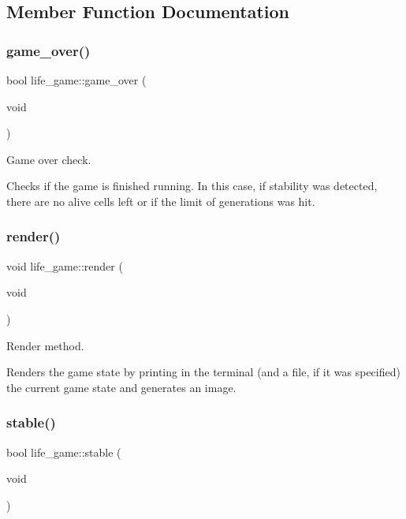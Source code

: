 \subsection{Member Function Documentation}
\mbox{\label{classlife__game_a12e6be26d78ff4e230efbe265c59c877}} 
\subsubsection{\texorpdfstring{game\+\_\+over()}{game\_over()}}
{\footnotesize\ttfamily bool life\+\_\+game\+::game\+\_\+over (\begin{DoxyParamCaption}\item[{void}]{ }\end{DoxyParamCaption})}



Game over check. 

Checks if the game is finished running. In this case, if stability was detected, there are no alive cells left or if the limit of generations was hit. \mbox{\label{classlife__game_a531eaaba274b4e9eee4df10244d631e5}} 
\subsubsection{\texorpdfstring{render()}{render()}}
{\footnotesize\ttfamily void life\+\_\+game\+::render (\begin{DoxyParamCaption}\item[{void}]{ }\end{DoxyParamCaption})}



Render method. 

Renders the game state by printing in the terminal (and a file, if it was specified) the current game state and generates an image. \mbox{\label{classlife__game_a51aec1198c8f5b41d910d90dd784f8bf}} 
\subsubsection{\texorpdfstring{stable()}{stable()}}
{\footnotesize\ttfamily bool life\+\_\+game\+::stable (\begin{DoxyParamCaption}\item[{void}]{ }\end{DoxyParamCaption})}



